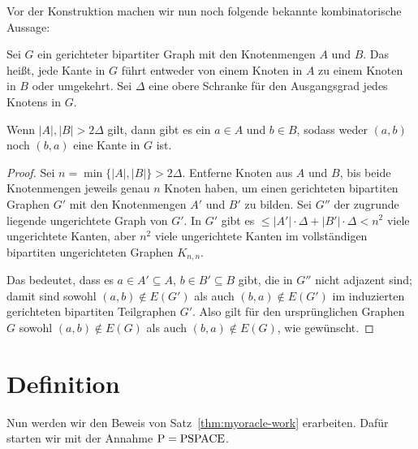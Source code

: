 Vor der Konstruktion machen wir nun noch folgende bekannte kombinatorische Aussage:
\begin{lemma}\label{lemma:bipartite}
    Sei $G$ ein gerichteter bipartiter Graph mit den Knotenmengen $A$ und $B$.
    Das heißt, jede Kante in $G$ führt entweder von einem Knoten in $A$ zu einem Knoten in $B$ oder umgekehrt.
    Sei $\Delta$ eine obere Schranke für den Ausgangsgrad jedes Knotens in $G$.

    Wenn $|A|,|B|>2\Delta$ gilt, dann gibt es ein $a\in A$ und $b\in B$, sodass weder $(a,b)$ noch $(b,a)$ eine Kante in $G$ ist.
\end{lemma}
\begin{proof}
    Sei $n=\min\{|A|,|B|\}>2\Delta$.
    Entferne Knoten aus $A$ und $B$, bis beide Knotenmengen jeweils genau $n$ Knoten haben, um einen gerichteten bipartiten Graphen $G'$ mit den Knotenmengen $A'$ und $B'$ zu bilden.
    Sei $G''$ der zugrunde liegende ungerichtete Graph von $G'$.
    In $G'$ gibt es $\leq |A'|\cdot \Delta + |B'|\cdot\Delta<n^2$ viele ungerichtete Kanten,
    aber $n^2$ viele ungerichtete Kanten im vollständigen bipartiten ungerichteten Graphen $K_{n,n}$.

    Das bedeutet, dass es $a\in A'\subseteq A$, $b\in B'\subseteq B$ gibt, die in $G''$ nicht adjazent sind; damit sind sowohl $(a,b)\not\in E(G')$ als auch $(b,a)\not\in E(G')$ im induzierten gerichteten bipartiten Teilgraphen $G'$.
    Also gilt für den ursprünglichen Graphen $G$ sowohl $(a,b)\not\in E(G)$ als auch $(b,a)\not\in E(G)$, wie gewünscht.
\end{proof}

\section{Definition}\label{sec:oracle-definition}

Nun werden wir den Beweis von Satz~\ref{thm:myoracle-work} erarbeiten. Dafür starten wir mit der Annahme $\mathrm{P}=\mathrm{PSPACE}$.

